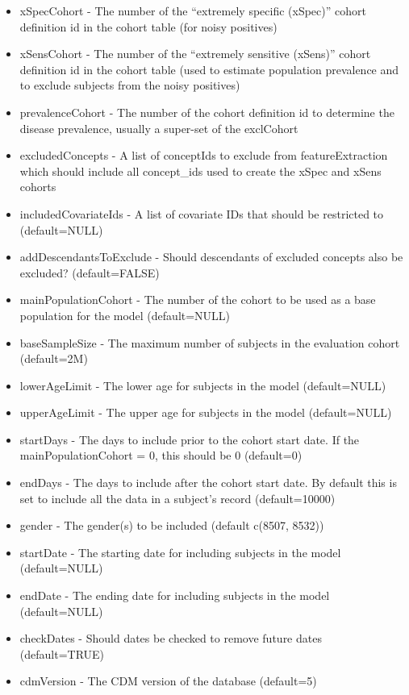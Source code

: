 \documentclass[
]{article}
\begin{document}
\begin{itemize}
\item
  xSpecCohort - The number of the ``extremely specific (xSpec)'' cohort
  definition id in the cohort table (for noisy positives)
\item
  xSensCohort - The number of the ``extremely sensitive (xSens)'' cohort
  definition id in the cohort table (used to estimate population
  prevalence and to exclude subjects from the noisy positives)
\item
  prevalenceCohort - The number of the cohort definition id to determine
  the disease prevalence, usually a super-set of the exclCohort
\item
  excludedConcepts - A list of conceptIds to exclude from
  featureExtraction which should include all concept\_ids used to create
  the xSpec and xSens cohorts
\item
  includedCovariateIds - A list of covariate IDs that should be
  restricted to (default=NULL)
\item
  addDescendantsToExclude - Should descendants of excluded concepts also
  be excluded? (default=FALSE)
\item
  mainPopulationCohort - The number of the cohort to be used as a base
  population for the model (default=NULL)
\item
  baseSampleSize - The maximum number of subjects in the evaluation
  cohort (default=2M)
\item
  lowerAgeLimit - The lower age for subjects in the model (default=NULL)
\item
  upperAgeLimit - The upper age for subjects in the model (default=NULL)
\item
  startDays - The days to include prior to the cohort start date. If the
  mainPopulationCohort = 0, this should be 0 (default=0)
\item
  endDays - The days to include after the cohort start date. By default
  this is set to include all the data in a subject's record
  (default=10000)
\item
  gender - The gender(s) to be included (default c(8507, 8532))
\item
  startDate - The starting date for including subjects in the model
  (default=NULL)
\item
  endDate - The ending date for including subjects in the model
  (default=NULL)
\item
  checkDates - Should dates be checked to remove future dates
  (default=TRUE)
\item
  cdmVersion - The CDM version of the database (default=5)

\end{itemize}
\end{document}
